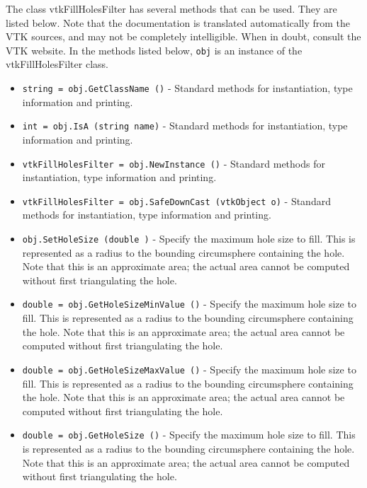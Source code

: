 The class vtkFillHolesFilter has several methods that can be used.
  They are listed below.
Note that the documentation is translated automatically from the VTK sources,
and may not be completely intelligible.  When in doubt, consult the VTK website.
In the methods listed below, \verb|obj| is an instance of the vtkFillHolesFilter class.
\begin{itemize}
\item  \verb|string = obj.GetClassName ()| -  Standard methods for instantiation, type information and printing.

\item  \verb|int = obj.IsA (string name)| -  Standard methods for instantiation, type information and printing.

\item  \verb|vtkFillHolesFilter = obj.NewInstance ()| -  Standard methods for instantiation, type information and printing.

\item  \verb|vtkFillHolesFilter = obj.SafeDownCast (vtkObject o)| -  Standard methods for instantiation, type information and printing.

\item  \verb|obj.SetHoleSize (double )| -  Specify the maximum hole size to fill. This is represented as a radius
 to the bounding circumsphere containing the hole.  Note that this is an
 approximate area; the actual area cannot be computed without first
 triangulating the hole.

\item  \verb|double = obj.GetHoleSizeMinValue ()| -  Specify the maximum hole size to fill. This is represented as a radius
 to the bounding circumsphere containing the hole.  Note that this is an
 approximate area; the actual area cannot be computed without first
 triangulating the hole.

\item  \verb|double = obj.GetHoleSizeMaxValue ()| -  Specify the maximum hole size to fill. This is represented as a radius
 to the bounding circumsphere containing the hole.  Note that this is an
 approximate area; the actual area cannot be computed without first
 triangulating the hole.

\item  \verb|double = obj.GetHoleSize ()| -  Specify the maximum hole size to fill. This is represented as a radius
 to the bounding circumsphere containing the hole.  Note that this is an
 approximate area; the actual area cannot be computed without first
 triangulating the hole.

\end{itemize}
